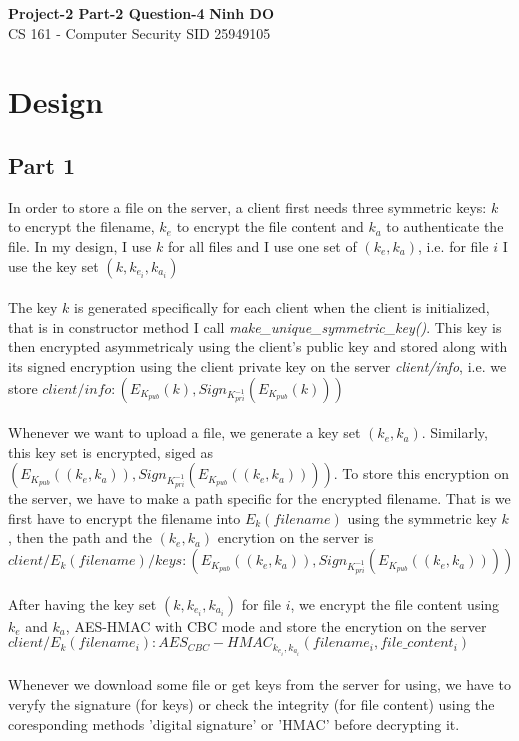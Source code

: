 \documentclass[a4paper, 11pt]{article}
\begin{document}
\noindent
\large\textbf{Project-2 Part-2 Question-4} \hfill \textbf{Ninh DO} \\
\normalsize CS 161 - Computer Security \hfill SID 25949105 \\

\section*{Design}
\subsection*{Part 1}
In order to store a file on the server, a client first needs three symmetric keys: $k$ to encrypt the filename, $k_e$ to encrypt the file content and $k_a$ to authenticate the file. In my design, I use $k$ for all files and I use one set of $(k_e, k_a)$, i.e. for file $i$ I use the key set $(k,k_{e_i},k_{a_i})$\\
\\
The key $k$ is generated specifically for each client when the client is initialized, that is in constructor method I call \textit{make\_unique\_symmetric\_key()}. This key is then encrypted asymmetricaly using the client's public key and stored along with its signed encryption using the client private key on the server \textit{client/info}, i.e. we store $client/info : \left(E_{K_{pub}}(k), Sign_{K^{-1}_{pri}}(E_{K_{pub}}(k))\right)$\\
\\
Whenever we want to upload a file, we generate a key set $(k_e, k_a)$. Similarly, this key set is encrypted, siged as $\left(E_{K_{pub}}((k_e, k_a)), Sign_{K^{-1}_{pri}}(E_{K_{pub}}((k_e, k_a)))\right)$. To store this encryption on the server, we have to make a path specific for the encrypted filename. That is we first have to encrypt the filename into $E_k(filename)$ using the symmetric key $k$, then the path and the $(k_e, k_a)$ encrytion on the server is $client/E_k(filename)/keys : \left(E_{K_{pub}}((k_e, k_a)), Sign_{K^{-1}_{pri}}(E_{K_{pub}}((k_e, k_a)))\right)$\\
\\
After having the key set $(k,k_{e_i},k_{a_i})$ for file $i$, we encrypt the file content using $k_e$ and $k_a$, AES-HMAC with CBC mode and store the encrytion on the server $client/E_k(filename_i) : AES_{CBC}-HMAC_{k_{e_i},k_{a_i}}(filename_i, file\_content_i)$\\
\\
Whenever we download some file or get keys from the server for using, we have to veryfy the signature (for keys) or check the integrity (for file content) using the coresponding methods 'digital signature' or 'HMAC' before decrypting it.\\
\\
\end{document}
